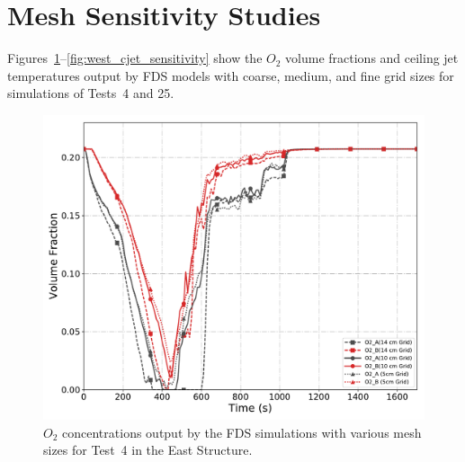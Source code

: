 \section{Mesh Sensitivity Studies}
\label{sec:mesh_studies}
Figures~\ref{fig:east_O2_sensitivity}--\ref{fig:west_cjet_sensitivity} show the $O_2$ volume fractions and ceiling jet temperatures output by FDS models with coarse, medium, and fine grid sizes for simulations of Tests~4 and 25.
\begin{figure}[!h]
	\centering
	\includegraphics[width=\columnwidth]{Figures/Plots/Grid_Sensitivity/Gas_Concentration/Test_04_O2}
	\caption[$O_2$ concentrations for East Structure simulations of various mesh sizes.]{$O_2$ concentrations output by the FDS simulations with various mesh sizes for Test~4 in the East Structure.}
	\label{fig:east_O2_sensitivity}
\end{figure}

